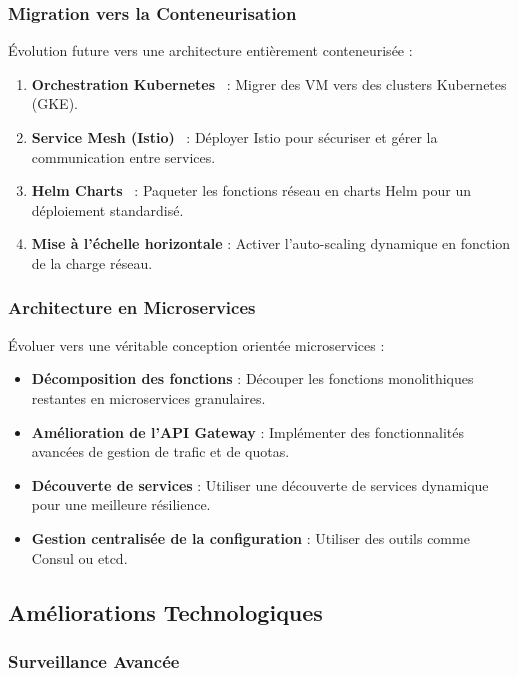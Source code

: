 \documentclass[12pt,a4paper]{report}
\begin{document}
\subsubsection{Migration vers la Conteneurisation}

Évolution future vers une architecture entièrement conteneurisée :

\begin{enumerate}
    \item \textbf{Orchestration Kubernetes}~\cite{kubernetes-docs} : Migrer des VM vers des clusters Kubernetes (GKE).
    \item \textbf{Service Mesh (Istio)}~\cite{istio-docs,service-mesh} : Déployer Istio pour sécuriser et gérer la communication entre services.
    \item \textbf{Helm Charts}~\cite{helm-docs} : Paqueter les fonctions réseau en charts Helm pour un déploiement standardisé.
    \item \textbf{Mise à l'échelle horizontale} : Activer l'auto-scaling dynamique en fonction de la charge réseau.
\end{enumerate}

\subsubsection{Architecture en Microservices}

Évoluer vers une véritable conception orientée microservices :

\begin{itemize}
    \item \textbf{Décomposition des fonctions} : Découper les fonctions monolithiques restantes en microservices granulaires.
    \item \textbf{Amélioration de l'API Gateway} : Implémenter des fonctionnalités avancées de gestion de trafic et de quotas.
    \item \textbf{Découverte de services} : Utiliser une découverte de services dynamique pour une meilleure résilience.
    \item \textbf{Gestion centralisée de la configuration} : Utiliser des outils comme Consul ou etcd.
\end{itemize}

\subsection{Améliorations Technologiques}

\subsubsection{Surveillance Avancée}
\end{document}
